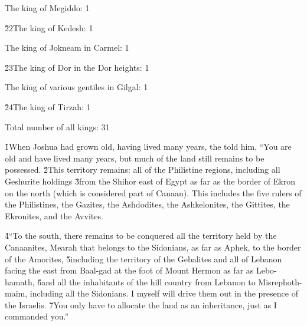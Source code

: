 The king of Megiddo: 1

\v{22}The king of Kedesh: 1

The king of Jokneam in Carmel: 1

\v{23}The king of Dor in the Dor heights: 1

The king of various gentiles in Gilgal: 1

\v{24}The king of Tirzah: 1

Total number of all kings: 31

\v{1}When Joshua had grown old, having lived many years, the  told him, ``You are old and have lived many years, but much of the land still remains to be possessed. \v{2}This territory remains: all of the Philistine regions, including all Geshurite holdings \v{3}from the Shihor east of Egypt as far as the border of Ekron on the north (which is considered part of Canaan). This includes the five rulers of the Philistines, the Gazites, the Ashdodites, the Ashkelonites, the Gittites, the Ekronites, and the Avvites.

\v{4}``To the south, there remains to be conquered all the territory held by the Canaanites, Mearah that belongs to the Sidonians, as far as Aphek, to the border of the Amorites, \v{5}including the territory of the Gebalites and all of Lebanon facing the east from Baal-gad at the foot of Mount Hermon as far as Lebo-hamath, \v{6}and all the inhabitants of the hill country from Lebanon to Misrephoth-maim, including all the Sidonians. I myself will drive them out in the presence of the Israelis. \v{7}You only have to allocate the land as an inheritance, just as I commanded you.''


